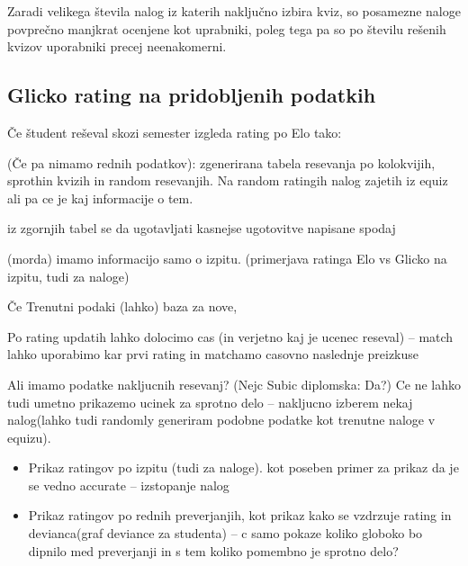 \documentclass{IEEEtran}
\makeatletter
\let\old@subsection\subsection
\renewcommand{\subsection}[1]{\bigskip\old@subsection{#1}\@afterindentfalse\@afterheading}
\makeatother
\begin{document}
Zaradi velikega števila nalog iz katerih naključno izbira kviz, so posamezne naloge povprečno manjkrat ocenjene kot uprabniki, poleg tega pa so po številu rešenih kvizov uporabniki precej neenakomerni.
\subsection{Glicko rating na pridobljenih podatkih}

\iffalse
Če študent reševal skozi semester izgleda rating po Elo tako: 

(Če pa nimamo rednih podatkov):
zgenerirana tabela resevanja po kolokvijih, sprothin kvizih in random resevanjih. Na random ratingih nalog zajetih iz equiz ali
pa ce je kaj informacije o tem.

iz zgornjih tabel se da ugotavljati kasnejse ugotovitve napisane spodaj

(morda) imamo informacijo samo o izpitu.
(primerjava ratinga Elo vs Glicko na izpitu, tudi za naloge)

Če 
Trenutni podaki (lahko) baza za nove,

Po rating updatih lahko dolocimo cas (in verjetno kaj je ucenec reseval) -- match lahko uporabimo kar prvi rating in matchamo casovno naslednje preizkuse

Ali imamo podatke nakljucnih resevanj? (Nejc Subic diplomska: Da?)
Ce ne lahko tudi umetno prikazemo ucinek za sprotno delo -- nakljucno izberem nekaj nalog(lahko tudi randomly generiram podobne podatke kot trenutne naloge v equizu).

\begin{itemize}
    \item Prikaz ratingov po izpitu (tudi za naloge). kot poseben primer za prikaz da je se vedno accurate -- izstopanje nalog
    \item Prikaz ratingov po rednih preverjanjih, kot prikaz kako se vzdrzuje rating in devianca(graf deviance za studenta) -- c samo pokaze koliko globoko bo dipnilo med preverjanji in s tem koliko pomembno je sprotno delo?
\end{itemize}
\end{document}
